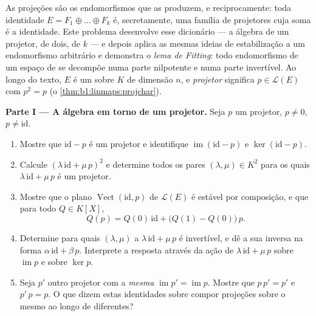 \begin{problem}\label{pb:b1:linmaps:1}
As projeções são os endomorfismos que as  produzem, e
reciprocamente: toda identidade $E = F_1 \oplus \dots \oplus F_k$ é, secretamente, uma família
de projetores cuja soma é a identidade. Este problema desenvolve
esse dicionário --- a álgebra de um projetor, de dois, de $k$ --- e
depois aplica as mesmas ideias de estabilização a um endomorfismo
arbitrário e demonstra o \emph{lema de Fitting}: todo endomorfismo
de um espaço de  se decompõe numa parte nilpotente e
numa parte invertível. Ao longo do texto, $E$ é um 
sobre $K$ de dimensão $n$, e \emph{projetor} significa $p \in \mathcal{L}(E)$ com
$p^2 = p$ (o \cref{thm:b1:linmaps:projchar}).

\medskip
\noindent\textbf{Parte I --- A álgebra em torno de um projetor.}
Seja $p$ um projetor, $p \neq 0$, $p \neq \mathrm{id}$.
\begin{enumerate}
  \item Mostre que $\mathrm{id} - p$ é um projetor e identifique $\operatorname{im}(\mathrm{id} - p)$ e
        $\ker(\mathrm{id} - p)$.
  \item Calcule $(\lambda\,\mathrm{id} + \mu\,p)^2$ e determine todos os pares $(\lambda, \mu) \in K^2$ para os
        quais $\lambda\,\mathrm{id} + \mu\,p$ é um projetor.
  \item Mostre que o plano $\operatorname{Vect}(\mathrm{id}, p)$ de $\mathcal{L}(E)$ é estável por
        composição, e que para todo  $Q \in K[X]$,
        \[
        Q(p) = Q(0)\,\mathrm{id} + \bigl(Q(1) -
        Q(0)\bigr)\,p .
        \]
  \item Determine para quais $(\lambda, \mu)$ a  $\lambda\,\mathrm{id} + \mu\,p$ é invertível,
        e dê a sua inversa na forma $\alpha\,\mathrm{id} + \beta\,p$. Interprete a resposta
        através da ação de $\lambda\,\mathrm{id} + \mu\,p$ sobre $\operatorname{im} p$ e sobre $\ker p$.
  \item Seja $p'$ outro projetor com a \emph{mesma } $\operatorname{im} p' = \operatorname{im} p$.
        Mostre que $p\,p' = p'$ e $p'\,p = p$. O que dizem estas identidades
        sobre compor projeções sobre o mesmo  ao longo de
         diferentes?
\end{enumerate}


\end{problem}
